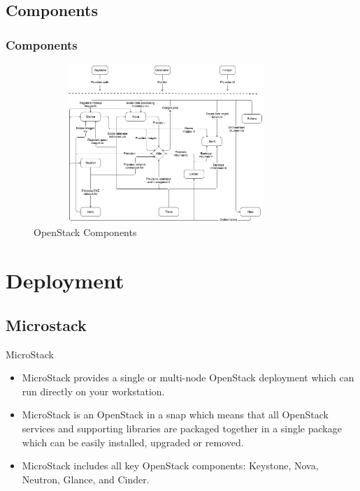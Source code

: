 \documentclass[english,hangout]{beamer}
\begin{document}
\subsection{Components}
\begin{frame}
    \frametitle{Components}
    \begin{figure}
        \centerline{\includegraphics[height=6cm,width=10cm]{openstack_kilo_conceptual_architecture.png}}
        \caption {OpenStack Components \cite{b2}}
        \label{openstackComponents}
    \end{figure}
\end{frame}

\section{Deployment}
\subsection{Microstack}
\begin{frame}{MicroStack\cite{b3}}
\begin{itemize}
   \item MicroStack provides a single or multi-node OpenStack deployment which can run directly on your workstation.
   \item MicroStack is an OpenStack in a snap which means that all OpenStack services and supporting libraries are packaged together in a single package which can be easily installed, upgraded or removed.
   \item MicroStack includes all key OpenStack components: Keystone, Nova, Neutron, Glance, and Cinder.
   \end{itemize}
\end{frame}
\end{document}
